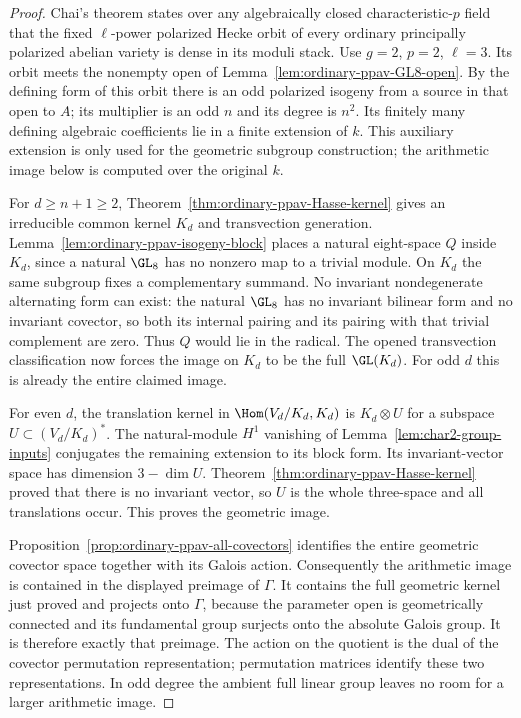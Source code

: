 \begin{proof}
Chai's theorem \cite[Theorem~2, printed p.~477]{Chai1995} states over
any algebraically closed characteristic-$p$ field that the fixed
$\ell$-power polarized Hecke orbit of every ordinary principally
polarized abelian variety is dense in its moduli stack.
Use $g=2$, $p=2$, $\ell=3$. Its orbit meets the nonempty open of
Lemma~\ref{lem:ordinary-ppav-GL8-open}. By the defining form of this orbit
there is an odd polarized isogeny from a source in that open to $A$;
its multiplier is an odd $n$ and its degree is $n^2$. Its finitely many
defining algebraic coefficients lie in a finite extension of $k$.
This auxiliary extension is only used for the geometric subgroup
construction; the arithmetic image below is computed over the original $k$.

For $d\ge n+1\ge2$, Theorem~\ref{thm:ordinary-ppav-Hasse-kernel} gives
an irreducible common kernel $K_d$ and transvection generation.
Lemma~\ref{lem:ordinary-ppav-isogeny-block} places a natural eight-space
$Q$ inside $K_d$, since a natural $\GL_8$ has no nonzero map to a trivial
module. On $K_d$ the same subgroup fixes a complementary summand.
No invariant nondegenerate alternating form can exist: the natural
$\GL_8$ has no invariant bilinear form and no invariant covector, so
both its internal pairing and its pairing with that trivial complement
are zero. Thus $Q$ would lie in the radical. The opened transvection
classification \cite[Theorem~3.6, printed p.~22]{KantorSeress2001} now
forces the image on $K_d$ to be the full $\GL(K_d)$.
For odd $d$ this is already the entire claimed image.

For even $d$, the translation kernel in
$\Hom(V_d/K_d,K_d)$ is $K_d\otimes U$ for a subspace
$U\subset(V_d/K_d)^*$. The natural-module $H^1$ vanishing of
Lemma~\ref{lem:char2-group-inputs} conjugates the remaining extension
to its block form. Its invariant-vector space has dimension
$3-\dim U$. Theorem~\ref{thm:ordinary-ppav-Hasse-kernel} proved that
there is no invariant vector, so $U$ is the whole three-space and
all translations occur. This proves the geometric image.

Proposition~\ref{prop:ordinary-ppav-all-covectors} identifies the entire
geometric covector space together with its Galois action. Consequently
the arithmetic image is contained in the displayed preimage of $\Gamma$.
It contains the full geometric kernel just proved and projects onto
$\Gamma$, because the parameter open is geometrically connected and
its fundamental group surjects onto the absolute Galois group.
It is therefore exactly that preimage. The action on the quotient is
the dual of the covector permutation representation; permutation matrices
identify these two representations. In odd degree the ambient full
linear group leaves no room for a larger arithmetic image.


\end{proof}
